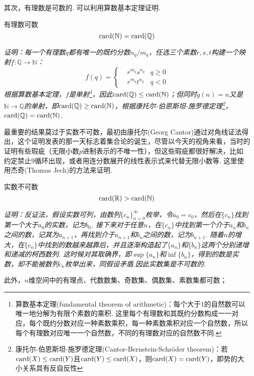 \documentclass[main.tex]{subfiles}
\begin{document}
其次，有理数是可数的. 可以利用算数基本定理证明.
\begin{theorem}{有理数可数}
    \[{\rm card}(\mathbb{N})={\rm card}(\mathbb{Q})\]
\end{theorem}
\textit{
    证明：每一个有理数\(q\)都有唯一的既约分数\(n_q/m_q\)，任选三个素数\(r,s,t\)构建一个映射\(f:\mathbb{Q} \to \mathbb{N}\)：
    \[f(q) = \left\{ \begin{aligned} & r^{m_q}s^{n_q} & q \geq 0 \\ & r^{m_q}t^{n_q} & q < 0 \end{aligned}\right.\]
    根据算数基本定理，\(f\)是单射\footnote{算数基本定理(fundamental theorem of arithmetic)：每个大于\(1\)的自然数可以唯一地分解为有限个素数的乘积. 这里每个有理数和其既约分数构成一一对应，每个既约分数对应一种素数乘积，每一种素数乘积对应一个自然数，所以每个有理数对应唯一一个自然数，不同的有理数对应的自然数不同.}，因此\({\rm card}(\mathbb{Q}) \leq {\rm card}(\mathbb{N})\)；但同时\(g(n)=n\)又是\(\mathbb{N} \to \mathbb{Q}\)的单射，即\({\rm card}(\mathbb{Q}) \geq {\rm card}(\mathbb{N})\)，根据康托尔-伯恩斯坦-施罗德定理\footnote{康托尔-伯恩斯坦-施罗德定理(Cantor-Bernstein-Schröder theorem)：若\({\rm card}(X) \leq {\rm card}(Y)\)且\({\rm card}(Y) \leq {\rm card}(X)\)，则\({\rm card}(X) = {\rm card}(Y)\)，即势的大小关系具有反自反性}，\({\rm card}(\mathbb{Q}) = {\rm card}(\mathbb{N})\).
}

最重要的结果莫过于实数不可数，最初由康托尔(Georg Cantor)通过对角线证法得出，这个证明发表的那一天标志着集合论的诞生，尽管以今天的视角来看，当时的证明有些瑕疵（无限小数\(p\)进制表示的不唯一性），但这些瑕疵都很好解决，比如约定禁止\(9\)循环出现，或者用连分数展开的线性表示式来代替无限小数等. 这里使用杰奇(Thomas Jech)的方法来证明.

\begin{theorem}{实数不可数}
    \[{\rm card}(\mathbb{R})>{\rm card}(\mathbb{N})\]
\end{theorem}
\textit{
    证明：反证法，假设实数可列，由数列\(\{c_n\}_{n=0}^{\infty}\)枚举，令\(a_0=c_0\)，然后在\(\{c_n\}\)找到第一个大于\(a_0\)的实数，记为\(b_0\). 接下来对于任意\(n\)，在\(\{c_n\}\)中找到第一个介于\(a_n\)和\(b_n\)之间的数，记其为\(a_{n+1}\)，再找到介于\(a_{n+1}\)和\(b_n\)之间的数，记为\(b_{n+1}\). 随着\(n\)的增大，在\(\{c_n\}\)中找到的数越来越靠后，并且逐渐构造起了\(\{a_n\}\)和\(\{b_n\}\)这两个分别递增和递减的柯西数列. 这时候对其取确界，即\(\sup\{a_n\}\)和\(\inf\{b_n\}\)，得到的数是实数，却不能被数列\(c_n\)枚举出来，同假设矛盾.因此实数集是不可数的.
}

此外，\(n\)维空间中的有理点、代数数集、奇数集、偶数集、素数集都可数；
\end{document}
